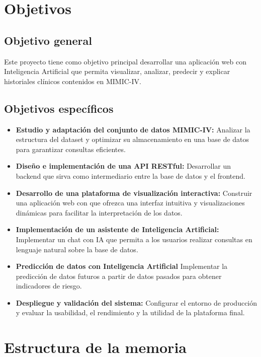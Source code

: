 \section{Objetivos}

\subsection{Objetivo general}

Este proyecto tiene como objetivo principal desarrollar una aplicación web con Inteligencia Artificial que permita visualizar, analizar, predecir y explicar historiales clínicos contenidos en MIMIC-IV.

\subsection{Objetivos específicos}

\begin{itemize}
    \item \textbf{Estudio y adaptación del conjunto de datos MIMIC-IV:} Analizar la estructura del dataset y optimizar su almacenamiento en una base de datos para garantizar consultas eficientes.
    \item \textbf{Diseño e implementación de una API RESTful:} Desarrollar un backend que sirva como intermediario entre la base de datos y el frontend.
    \item \textbf{Desarrollo de una plataforma de visualización interactiva:} Construir una aplicación web con que ofrezca una interfaz intuitiva y visualizaciones dinámicas para facilitar la interpretación de los datos.
    \item \textbf{Implementación de un asistente de Inteligencia Artificial:} Implementar un chat con IA que permita a los usuarios realizar consultas en lenguaje natural sobre la base de datos.
    \item \textbf{Predicción de datos con Inteligencia Artificial} Implementar la predicción de datos futuros a partir de datos pasados para obtener indicadores de riesgo.
    \item \textbf{Despliegue y validación del sistema:} Configurar el entorno de producción y evaluar la usabilidad, el rendimiento y la utilidad de la plataforma final.
\end{itemize}

\section{Estructura de la memoria}

